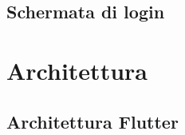 \subsection{Schermata di login}
\label{subsec:login}


\section{Architettura}
\label{sec:architettura}

\subsection{Architettura Flutter}
\label{subsec:architettura-flutter}

